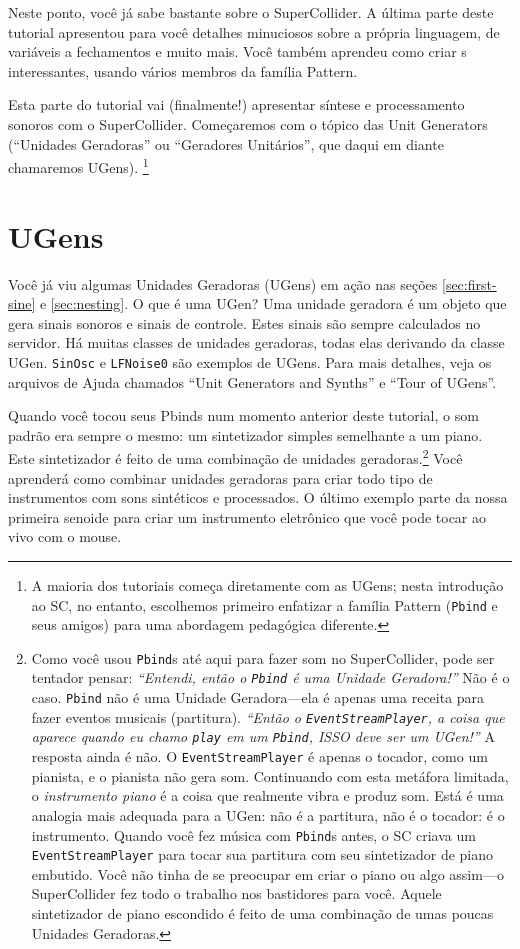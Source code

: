 Neste ponto, você já sabe bastante sobre o SuperCollider. A última parte deste tutorial apresentou para você detalhes minuciosos sobre a própria linguagem, de variáveis a fechamentos e muito mais. Você também aprendeu como criar s interessantes, usando vários membros da família Pattern.

Esta parte do tutorial vai (finalmente!) apresentar síntese e processamento sonoros com o SuperCollider. Começaremos com o tópico das Unit Generators (“Unidades Geradoras” ou “Geradores Unitários”, que daqui em diante chamaremos UGens). \footnote{A maioria dos tutoriais começa diretamente com as UGens; nesta introdução ao SC, no entanto, escolhemos primeiro enfatizar a família Pattern (\texttt{Pbind} e seus amigos) para uma abordagem pedagógica diferente.}

\section{UGens}

Você já viu algumas Unidades Geradoras (UGens) em ação nas seções \ref{sec:first-sine} e \ref{sec:nesting}. O que é uma UGen? Uma unidade geradora é um objeto que gera sinais sonoros e sinais de controle. Estes sinais são sempre calculados no servidor. Há muitas classes de unidades geradoras, todas elas derivando da classe UGen. \texttt{SinOsc} e \texttt{LFNoise0} são exemplos de UGens. Para mais detalhes, veja os arquivos de Ajuda chamados “Unit Generators and Synths” e “Tour of UGens”. 

Quando você tocou seus Pbinds num momento anterior deste tutorial, o som padrão era sempre o mesmo: um sintetizador simples semelhante a um piano. Este sintetizador é feito de uma combinação de unidades geradoras.\footnote{Como você usou \texttt{Pbind}s até aqui para fazer som no SuperCollider, pode ser tentador pensar: \textit{“Entendi, então o \texttt{Pbind} é uma Unidade Geradora!”} Não é o caso. \texttt{Pbind} não é uma Unidade Geradora---ela é apenas uma receita para fazer eventos musicais (partitura). \textit{“Então o \texttt{EventStreamPlayer}, a coisa que aparece quando eu chamo \texttt{play} em um \texttt{Pbind}, ISSO deve ser um UGen!”} A resposta ainda é não. O \texttt{EventStreamPlayer} é apenas o tocador, como um pianista, e o pianista não gera som. Continuando com esta metáfora limitada, o \emph{instrumento piano} é a coisa que realmente vibra e produz som. Está é uma analogia mais adequada para a UGen: não é a partitura, não é o tocador: é o instrumento. Quando você fez música com \texttt{Pbind}s antes, o SC criava um \texttt{EventStreamPlayer} para tocar sua partitura com seu sintetizador de piano embutido. Você não tinha de se preocupar em criar o piano ou algo assim---o SuperCollider fez todo o trabalho nos bastidores para você. Aquele sintetizador de piano escondido é feito de uma combinação de umas poucas Unidades Geradoras.} Você aprenderá como combinar unidades geradoras para criar todo tipo de instrumentos com sons sintéticos e processados. O último exemplo parte da nossa primeira senoide para criar um instrumento eletrônico que você pode tocar ao vivo com o mouse.

